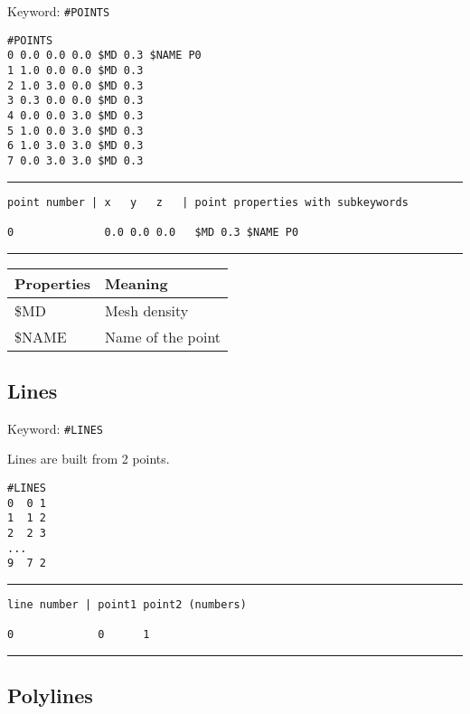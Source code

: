 Keyword: \texttt{\#POINTS}

\small
\begin{verbatim}
#POINTS
0 0.0 0.0 0.0 $MD 0.3 $NAME P0
1 1.0 0.0 0.0 $MD 0.3
2 1.0 3.0 0.0 $MD 0.3
3 0.3 0.0 0.0 $MD 0.3
4 0.0 0.0 3.0 $MD 0.3
5 1.0 0.0 3.0 $MD 0.3
6 1.0 3.0 3.0 $MD 0.3
7 0.0 3.0 3.0 $MD 0.3
\end{verbatim}
\normalsize

\small
\hrule

\begin{verbatim}
point number | x   y   z   | point properties with subkeywords

0              0.0 0.0 0.0   $MD 0.3 $NAME P0

\end{verbatim}

\hrule
\normalsize

\begin{center}
\begin{tabular}{|l|l|}
\hline
Properties   & Meaning \\
\hline \hline
%
\$MD            & Mesh density  \\
\$NAME          & Name of the point  \\
\hline
\end{tabular}
\end{center}

\subsection{Lines}

Keyword: \texttt{\#LINES}

Lines are built from 2 points.

\small
\begin{verbatim}
#LINES
0  0 1
1  1 2
2  2 3
...
9  7 2
\end{verbatim}
\normalsize

\small
\hrule
\begin{minipage}[t]{4cm}
\begin{verbatim}
line number | point1 point2 (numbers)

0             0      1

\end{verbatim}
\end{minipage}
\hrule
\normalsize

\subsection{Polylines}

